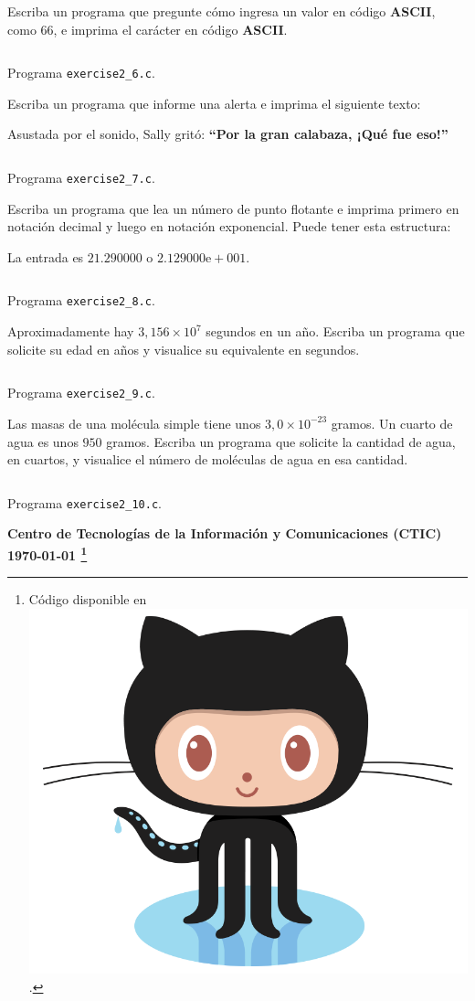 \documentclass[spanish,addpoints,answers,a4paper]{exam}
\newcommand{\unmarkedfntext}[1]{%
	\begingroup
	\renewcommand\thefootnote{}\footnote{#1}%
	\addtocounter{footnote}{-1}%
	\endgroup
}
\newcommand{\mychar}{%
	\begingroup\normalfont
	\includegraphics[height=\fontcharht\font`\B]{Octocat.png}%
	\endgroup
}
\begin{document}
\begin{questions}
\question Escriba un programa que pregunte cómo ingresa un valor en código \textbf{ASCII}, como $66$, e imprima el carácter en código \textbf{ASCII}.

\begin{solution}
\begin{listing}[H]
	\footnotesize
	\inputminted{c}{exercise2_6.c}
	\caption{Programa \texttt{exercise2\_6.c}.}
	\label{lst:2.6}
\end{listing}
\end{solution}

\question Escriba un programa que informe una alerta e imprima el siguiente texto:

Asustada por el sonido, Sally gritó: \textbf{``Por la gran calabaza, ¡Qué fue eso!''}

\begin{solution}
\begin{listing}[H]
	\footnotesize
	\inputminted{c}{exercise2_7.c}
	\caption{Programa \texttt{exercise2\_7.c}.}
	\label{lst:2.7}
\end{listing}	
\end{solution}

\question Escriba un programa que lea un número de punto flotante e imprima primero en notación decimal y luego en notación exponencial. Puede tener esta estructura:

La entrada es $21.290000$ o $2.129000\text{e}+001$.

\begin{solution}
\begin{listing}[H]
	\footnotesize
	\inputminted{c}{exercise2_8.c}
	\caption{Programa \texttt{exercise2\_8.c}.}
	\label{lst:2.8}
\end{listing}
\end{solution}

\question Aproximadamente hay $3,156\times10^{7}$ segundos en un año. Escriba un programa que solicite su edad en años y visualice su equivalente en segundos.

\begin{solution}
\begin{listing}[H]
	\footnotesize
	\inputminted{c}{exercise2_9.c}
	\caption{Programa \texttt{exercise2\_9.c}.}
	\label{lst:2.9}
\end{listing}
\end{solution}

\question Las masas de una molécula simple tiene unos $3,0\times10^{-23}$ gramos. Un cuarto de agua es unos $950$ gramos. Escriba un programa que solicite la cantidad de agua, en cuartos, y visualice el número de moléculas de agua en esa cantidad.

\begin{solution}
\begin{listing}[H]
	\footnotesize
	\inputminted{c}{exercise2_10.c}
	\caption{Programa \texttt{exercise2\_10.c}.}
	\label{lst:2.10}
\end{listing}
\end{solution}

\end{questions}

\begin{flushright}\bfseries
Centro de Tecnologías de la Información y Comunicaciones (CTIC)\\[2mm]
\today\unmarkedfntext{Código disponible en \href{https://github.com/carlosal1015/C-Programming}{\mychar{}}.}
\end{flushright}
\end{document}

